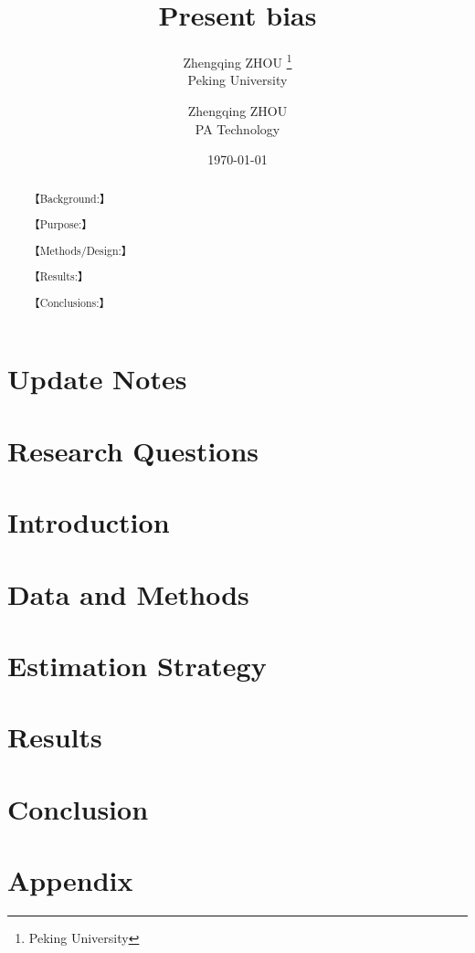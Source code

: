 \documentclass[lang=en, 12pt, a4paper, cite=super, chinesefont=Mac-default]{elegantpaper}
\title{Present bias }
\author{Zhengqing ZHOU \thanks{Peking University} \\ Peking University \and Zhengqing ZHOU \\ PA Technology}
\institute{\href{https://pe.pku.edu.cn/}{Department of Physical Education}}
\date{\today}
\begin{document}
{\selectfont
\clearpage
\maketitle
\thispagestyle{empty}

\begin{abstract}
{\selectfont
 \par
【Background:】
\par
【Purpose:】
\par
【Methods/Design:】 
\par
【Results:】 
\par
【Conclusions:】
\par
{}
}
\end{abstract}

	\newpage
    \tableofcontents
    \setcounter{page}{1}
	\newpage

	\newpage
    \section*{Update Notes}\label{Update Notes}
    
	\newpage
	\section{Research Questions} \label{Research Questions}
	
	\newpage
	\section{Introduction}\label{Introduction}
	
    \newpage
    \section{Data and Methods}\label{Data and Methods}
    
    \newpage
    \section{Estimation Strategy}\label{Estimation Strategy}
    
    \newpage
    \section{Results}\label{Results}
    
	\newpage
	\section{Conclusion} \label{Conclusion}
	
	\newpage
	\appendix
	\section{Appendix}\label{Appendix}
	
	
	\newpage
    \printbibliography[heading=bibintoc, title=\ebibname]
    \appendix
    \addappheadtotoc

}
\end{document}
